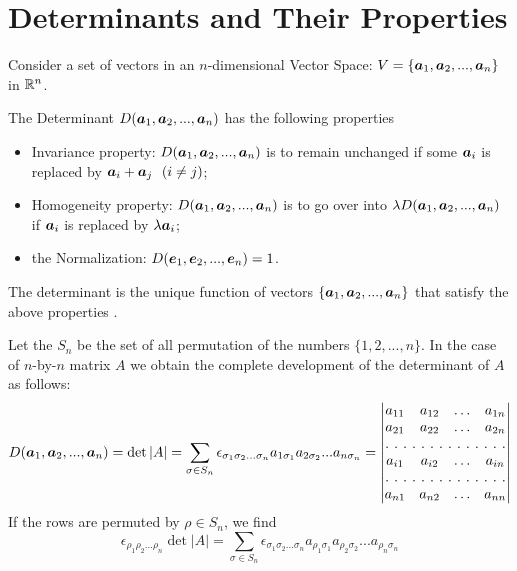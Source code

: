 \section{Determinants and Their Properties}

Consider a set of vectors in an $n$-dimensional Vector Space: $V = \{ \boldsymbol{a}_1, \boldsymbol{a}_2, ...,\boldsymbol{a}_n\}$ in $\mathbb{R}^n$.
\begin{definition}[Determinant]
The Determinant $D(\boldsymbol{a}_1,\boldsymbol{a}_2,...,\boldsymbol{a}_n)$ has the following properties
\begin{itemize}
\item[i)] Invariance property: $D(\boldsymbol{a}_1,\boldsymbol{a}_2,...,\boldsymbol{a}_n)$ is to remain unchanged if some $\boldsymbol{a}_i$ is replaced by $\boldsymbol{a}_i+\boldsymbol{a}_j ~~(i \ne j)$;
\item[ii)] Homogeneity property: $D(\boldsymbol{a}_1,\boldsymbol{a}_2,...,\boldsymbol{a}_n)$ is to go over into $\lambda D(\boldsymbol{a}_1,\boldsymbol{a}_2,...,\boldsymbol{a}_n)$ if $\boldsymbol{a}_i$ is replaced by $\lambda \boldsymbol{a}_i$;
\item[iii)] the Normalization: $D(\boldsymbol{e}_1, \boldsymbol{e}_2,..., \boldsymbol{e}_n) = 1$.
\end{itemize} The determinant is the unique function of vectors $\{ \boldsymbol{a}_1, \boldsymbol{a}_2, ...,\boldsymbol{a}_n\}$ that satisfy the above properties \cite{Schreier and Sperner}.\\
\end{definition}

\begin{definition}
Let the $S_n$ be the set of all permutation of the numbers $\{1,2,...,n\}$. In the case of $n$-by-$n$ matrix $A$ we obtain the complete
development of the determinant of $A$ as follows:
\begin{equation}
D(\a_1,\a_2,...,\a_n) = \det |A| = \sum_{\sigma \in S_{n}} \epsilon_{ \sigma_1 \sigma_2 ... \sigma_{n}} a_{1 \sigma_1} a_{2 \sigma_2} ... a_{n \sigma_n} \label{detA} =
\begin{vmatrix}
a_{11} & a_{12} & \hdots & a_{1n} \\
a_{21} & a_{22} & \hdots & a_{2n} \\
\hdotsfor[2]{4}\\
a_{i1} & a_{i2} & \hdots & a_{in} \\
\hdotsfor[2]{4}\\
a_{n1} & a_{n2} & \hdots & a_{nn} \\
\end{vmatrix}
\end{equation}
If the rows are permuted by $\rho \in S_n$, we find
\begin{equation}
\epsilon_{ \rho_1 \rho_2 ... \rho_{n}}\det |A| = \sum_{\sigma \in S_{n}} \epsilon_{ \sigma_1 \sigma_2 ... \sigma_{n}} a_{\rho_1 \sigma_1} a_{\rho_2 \sigma_2} ... a_{\rho_n \sigma_n} \label{detA}
\end{equation}
\end{definition}

